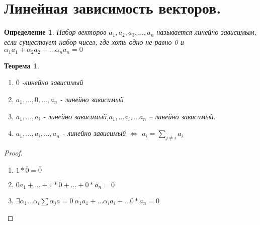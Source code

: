\documentclass{scrartcl}
\newtheorem{theorem}{Теорема}
\newtheorem{definition}{Определение}
\begin{document}
    \section{Линейная зависимость векторов.}
    \begin{definition}
        Набор векторов $a_1,a_2,a_3,\dots,a_{n}$ называется линейно зависимым, если существует набор чисел, где хоть одно не равно 0 и $\alpha_1 a_1 + \alpha_2 a_2 + \dots \alpha_{n}a_{n} = 0 $
    \end{definition}
    \begin{theorem}
         \begin{enumerate}
             \item 
        $\overline{0}$ -линейно зависимый
    \item $a_1,\dots,0,\dots,a_n$ - линейно зависимый
        \item
            $a_{1}, \dots,a_{i}$ - линейно зависимый,$a_1,\dots a_{i},\dots a_{n}$ -- линейно зависимый.
        \item
            $a_1, \dots, a_{i},\dots,a_{n}$ - линейно зависимый $\iff$  $a_{i} =
            \sum_{j \neq i} a_{i}$
         \end{enumerate}
    \end{theorem}
    \begin{proof}
        \begin{enumerate}
            \item $1 * \overline{0} = \overline{0}$ 
                \item
                    $0a_1 + \dots + 1 * \overline{0} + \dots + 0 * \overline{a_{n}}= 0$
                    \item
                        $\exists {\alpha_1 \dots \alpha_{i}} \sum \alpha_{j}a =0 ~ 
                        \alpha_1 a_1 + \dots \alpha_{i}a_{i} + \dots 0*a_{n} = 0$
        \end{enumerate}
    \end{proof}
\end{document}
